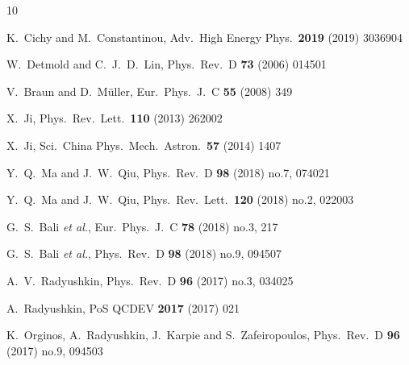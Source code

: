 \begin{thebibliography}{10}

  K.~Cichy and M.~Constantinou,
  Adv.\ High Energy Phys.\ {\bf 2019} (2019) 3036904

  W.~Detmold and C.~J.~D.~Lin,
  Phys.\ Rev.\ D {\bf 73} (2006) 014501

  V.~Braun and D.~M{\"u}ller,
  Eur.\ Phys.\ J.\ C {\bf 55} (2008) 349

  X.~Ji,
  Phys.\ Rev.\ Lett.\ {\bf 110} (2013) 262002

  X.~Ji,
  Sci.\ China Phys.\ Mech.\ Astron.\ {\bf 57} (2014) 1407

  Y.~Q.~Ma and J.~W.~Qiu,
  Phys.\ Rev.\ D {\bf 98} (2018) no.7, 074021

  Y.~Q.~Ma and J.~W.~Qiu,
  Phys.\ Rev.\ Lett.\ {\bf 120} (2018) no.2, 022003

  G.~S.~Bali {\it et al.},
  Eur.\ Phys.\ J.\ C {\bf 78} (2018) no.3, 217

  G.~S.~Bali {\it et al.},
  Phys.\ Rev.\ D {\bf 98} (2018) no.9, 094507

  A.~V.~Radyushkin,
  Phys.\ Rev.\ D {\bf 96} (2017) no.3, 034025

  A.~Radyushkin,
  PoS QCDEV {\bf 2017} (2017) 021

  K.~Orginos, A.~Radyushkin, J.~Karpie and S.~Zafeiropoulos,
  Phys.\ Rev.\ D {\bf 96} (2017) no.9, 094503


\end{thebibliography}
